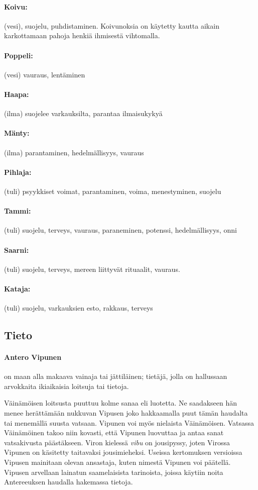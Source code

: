   \paragraph{Koivu:} (vesi), suojelu, puhdistaminen. Koivunoksia on käytetty kautta aikain 
    karkottamaan pahoja henkiä ihmisestä vihtomalla. 
  \paragraph{Poppeli:} (vesi) vauraus, lentäminen
  \paragraph{Haapa:} (ilma) suojelee varkauksilta, parantaa ilmaisukykyä
  \paragraph{Mänty:} (ilma) parantaminen, hedelmällisyys, vauraus
  \paragraph{Pihlaja:} (tuli) psyykkiset voimat, parantaminen, voima, menestyminen, suojelu
  \paragraph{Tammi:} (tuli) suojelu, terveys, vauraus, paraneminen, potenssi, hedelmällisyys, onni
  \paragraph{Saarni:} (tuli) suojelu, terveys, mereen liittyvät rituaalit, vauraus. 
  \paragraph{Kataja:} (tuli) suojelu, varkauksien esto, rakkaus, terveys


\subsection{Tieto}

  \paragraph{Antero Vipunen} on maan alla makaava vainaja tai jättiläinen; tietäjä, jolla on 
    hallussaan arvokkaita ikiaikaisia loitsuja tai tietoja. \par Väinämöisen loitsusta puuttuu kolme 
    sanaa eli luotetta. Ne saadakseen hän menee herättämään nukkuvan Vipusen joko hakkaamalla 
    puut tämän haudalta tai menemällä suusta vatsaan. Vipunen voi myös nielaista Väinämöisen. 
    Vatsassa Väinämöinen takoo niin kovasti, että Vipunen luovuttaa ja antaa sanat vatsakivusta 
    päästäkseen. Viron kielessä \emph{vibu} on jousipyssy, joten Virossa Vipunen on käsitetty taitavaksi 
    jousimieheksi. Useissa kertomuksen versioissa Vipusen mainitaan olevan ansastaja, kuten 
    nimestä Vipunen voi päätellä. Vipusen arvellaan lainatun saamelaisista tarinoista, joissa käytiin 
    noita Antereeuksen haudalla hakemassa tietoja.

